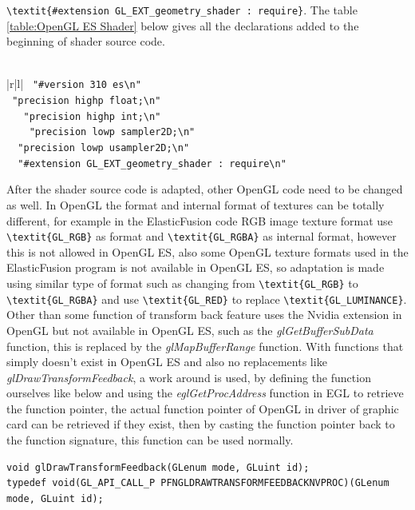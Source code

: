 \documentclass[12pt,twoside]{article}
\begin{document}
\verb|\textit{#extension GL_EXT_geometry_shader : require}|. The table \ref{table:OpenGL ES Shader} below gives all the declarations added to the beginning of shader source code.\\
\\
\begin{table}
\centering
\caption{OpenGL ES Shader adaptation}
\label{table:OpenGL ES Shader}
\begin{tabular}{\textwidth}{|r|l|}
  \hline
  \verb| "#version 310 es\n" |\\
  \verb| "precision highp float;\n"| \\
  \verb|   "precision highp int;\n" |\\
   \verb|    "precision lowp sampler2D;\n"| \\ 
   \verb|  "precision lowp usampler2D;\n" |\\
 \verb|  "#extension GL_EXT_geometry_shader : require\n"| \\
    \hline
\end{tabular}
\end{table}
After the shader source code is adapted, other OpenGL code need to be changed as well. In OpenGL the format and internal format of textures can be totally different, for example in the ElasticFusion code RGB image texture format use \verb|\textit{GL_RGB}| as format and \verb|\textit{GL_RGBA}| as internal format, however this is not allowed in OpenGL ES, also some OpenGL texture formats used in the ElasticFusion program is not available in OpenGL ES, so adaptation is made using similar type of format such as changing from \verb|\textit{GL_RGB}| to \verb|\textit{GL_RGBA}| and use \verb|\textit{GL_RED}| to replace \verb|\textit{GL_LUMINANCE}|. Other than some function of transform back feature uses the Nvidia extension in OpenGL but not available in OpenGL ES, such as the \textit{glGetBufferSubData} function, this is replaced by the \textit{glMapBufferRange} function. With functions that simply doesn't exist in OpenGL ES and also no replacements like \textit{glDrawTransformFeedback}, a work around is used, by defining the function ourselves like below and using the \textit{eglGetProcAddress} function in EGL to retrieve the function pointer, the actual function pointer of OpenGL in driver of graphic card can be retrieved if they exist, then by casting the function pointer back to the function signature, this function can be used normally.\\
\begin{lstlisting}
void glDrawTransformFeedback(GLenum mode, GLuint id);
typedef void(GL_API_CALL_P PFNGLDRAWTRANSFORMFEEDBACKNVPROC)(GLenum mode, GLuint id);
\end{lstlisting}
\end{document}

